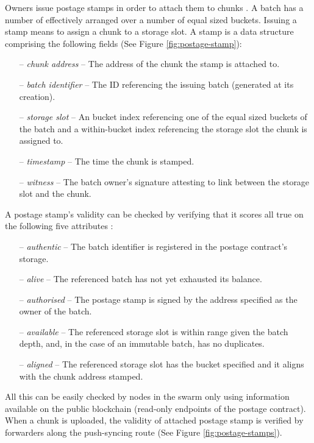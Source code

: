 Owners issue postage stamps in order to attach them to chunks%
. A batch has a number of  effectively arranged over a number of equal sized buckets. Issuing a stamp means to assign a chunk to a storage slot. A stamp is a data structure comprising the following fields (See Figure  \ref{fig:postage-stamp}):

\begin{itemize}[noitemsep]
    \item[--] \emph{chunk address} -- The address of the chunk the stamp is attached to. 
    \item[--] \emph{batch identifier} --  The ID referencing the issuing batch (generated at its creation).
    \item[--] \emph{storage slot} -- An bucket index referencing one of the equal sized buckets of the batch and a within-bucket index referencing the storage slot the chunk is assigned to.
    \item[--] \emph{timestamp} -- The time the chunk is stamped. 
    \item[--] \emph{witness} -- The batch owner's signature attesting to link between the storage slot and the chunk.
\end{itemize}

A postage stamp's validity can be checked by verifying that it scores all true on the following five attributes%
:

\begin{itemize}[noitemsep]
\item[--] \emph{authentic} -- The batch identifier is registered in the postage contract's storage.
\item[--] \emph{alive} -- The referenced batch has not yet exhausted its balance.
\item[--] \emph{authorised} -- The postage stamp is signed by the address specified as the owner of the batch. 
\item[--] \emph{available} -- The referenced storage slot is within range given the batch depth, and, in the case of an immutable batch, has no duplicates.
\item[--] \emph{aligned} -- The referenced storage slot has the bucket specified and it aligns with the chunk address stamped.
\end{itemize}

All this can be easily checked by nodes in the swarm only using information available on the public blockchain (read-only endpoints of the postage contract). When a chunk is uploaded, the validity of attached postage stamp is verified by forwarders along the push-syncing route  (See Figure \ref{fig:postage-stamps}).


